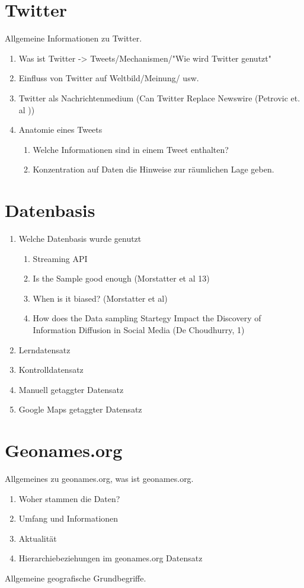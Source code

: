 	\section{Twitter}
		Allgemeine Informationen zu Twitter. 
		\begin{enumerate}
			\item Was ist Twitter -> Tweets/Mechanismen/"Wie wird Twitter genutzt"
			\item {} Einfluss von Twitter auf Weltbild/Meinung/ usw.
			\item Twitter als Nachrichtenmedium (Can Twitter Replace Newswire (Petrovic et. al ))
			\item Anatomie eines Tweets 
				\begin{enumerate}
					\item Welche Informationen sind in einem Tweet enthalten? 
					\item Konzentration auf Daten die Hinweise zur räumlichen Lage geben.
				\end{enumerate}
		\end{enumerate}
		
	\section{Datenbasis}
		\begin{enumerate}
			\item Welche Datenbasis wurde genutzt 
				\begin{enumerate}
					\item Streaming API
					\item Is the Sample good enough (Morstatter et al 13)
					\item When is it biased? (Morstatter et al)
					\item How does the Data sampling Startegy Impact the Discovery of Information Diffusion in Social Media (De Choudhurry, 1)
				\end{enumerate}
			\item Lerndatensatz
			\item Kontrolldatensatz
			\item Manuell getaggter Datensatz
			\item Google Maps getaggter Datensatz
		\end{enumerate}			
	
	\section{Geonames.org}
		Allgemeines zu geonames.org, was ist geonames.org. 
		\begin{enumerate}
			\item Woher stammen die Daten?
			\item Umfang und Informationen
			\item Aktualität
			\item Hierarchiebeziehungen im geonames.org Datensatz
		\end{enumerate}			
		 Allgemeine geografische Grundbegriffe.

